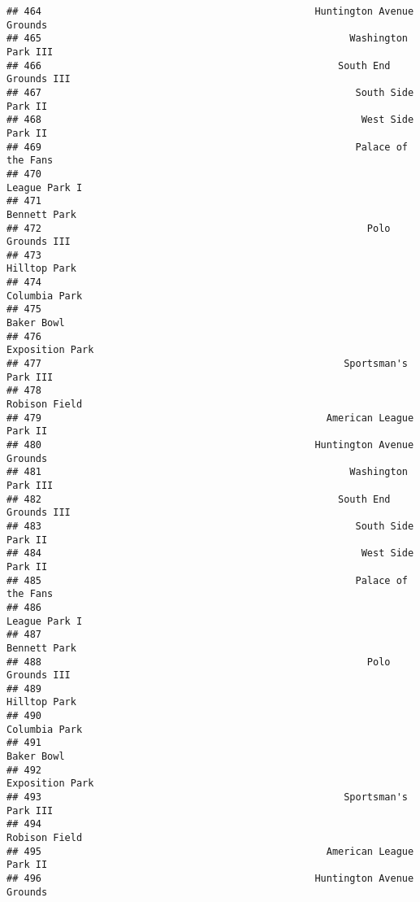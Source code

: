 \documentclass[]{article}
\begin{document}
\begin{verbatim}
## 464                                               Huntington Avenue Grounds
## 465                                                     Washington Park III
## 466                                                   South End Grounds III
## 467                                                      South Side Park II
## 468                                                       West Side Park II
## 469                                                      Palace of the Fans
## 470                                                           League Park I
## 471                                                            Bennett Park
## 472                                                        Polo Grounds III
## 473                                                            Hilltop Park
## 474                                                           Columbia Park
## 475                                                              Baker Bowl
## 476                                                         Exposition Park
## 477                                                    Sportsman's Park III
## 478                                                           Robison Field
## 479                                                 American League Park II
## 480                                               Huntington Avenue Grounds
## 481                                                     Washington Park III
## 482                                                   South End Grounds III
## 483                                                      South Side Park II
## 484                                                       West Side Park II
## 485                                                      Palace of the Fans
## 486                                                           League Park I
## 487                                                            Bennett Park
## 488                                                        Polo Grounds III
## 489                                                            Hilltop Park
## 490                                                           Columbia Park
## 491                                                              Baker Bowl
## 492                                                         Exposition Park
## 493                                                    Sportsman's Park III
## 494                                                           Robison Field
## 495                                                 American League Park II
## 496                                               Huntington Avenue Grounds

\end{verbatim}
\end{document}
